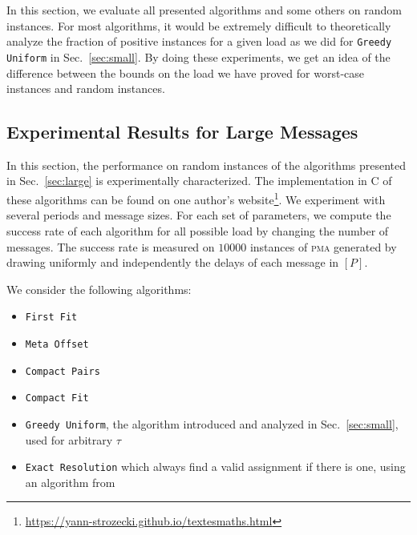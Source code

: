 \documentclass[a4paper,UKenglish,cleveref, autoref, thm-restate]{lipics-v2019}
\newcommand\pma{\textsc{pma}\xspace}
\newcommand\firstfit{\texttt{First Fit}\xspace}
\newcommand\compactpair{\texttt{Compact Pairs}\xspace}
\newcommand\metaoffset{\texttt{Meta Offset}\xspace}
\newcommand\greedyuniform{\texttt{Greedy Uniform}\xspace}
\newcommand\compactfit{\texttt{Compact Fit}\xspace}
\begin{document}
In this section, we evaluate all presented algorithms and some others on random instances.
For most algorithms, it would be extremely difficult to theoretically analyze the fraction of positive instances for a given load as we did for \greedyuniform in Sec.~\ref{sec:small}. By doing these experiments, we get an idea of the difference between the bounds on the load we have proved for worst-case instances and random instances.


\subsection{Experimental Results for Large Messages} \label{sec:perf_large}


In this section, the performance on random instances of the algorithms presented in Sec.~\ref{sec:large} is experimentally characterized. The implementation in C of these algorithms can be found on one author's website\footnote{\url{https://yann-strozecki.github.io/textesmaths.html}}. We experiment with several periods and message sizes. For each set of parameters, we compute the success rate of each algorithm for all possible load by changing the number of messages. The success rate is measured on $10000$ instances of \pma generated by drawing uniformly and independently the delays of each message in $[P]$. 

We consider the following algorithms:
\begin{itemize}
  \item \firstfit
  \item \metaoffset
  \item \compactpair
  \item \compactfit
  \item \greedyuniform, the algorithm introduced and analyzed in Sec.~\ref{sec:small}, used for arbitrary $\tau$
  \item \texttt{Exact Resolution} which always find a valid assignment if there is one, using an algorithm from~\cite{bartharxiv2018deterministic}  
\end{itemize}
\end{document}
